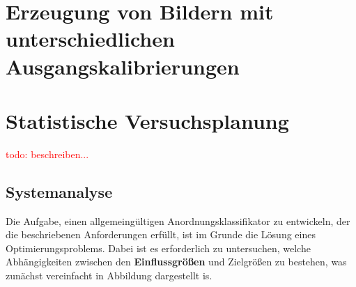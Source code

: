 \documentclass[
fontsize=10pt, 
listof = totoc,
parskip = half	
]{report}
\begin{document}
\section{Erzeugung von Bildern mit unterschiedlichen Ausgangskalibrierungen}


\section{Statistische Versuchsplanung}


\noindent\textcolor{red}{todo:  beschreiben...}  

\subsection{Systemanalyse}
Die Aufgabe, einen allgemeingültigen Anordnungsklassifikator zu entwickeln, der die beschriebenen Anforderungen erfüllt, ist im Grunde die Lösung eines Optimierungsproblems. Dabei ist es erforderlich zu untersuchen, welche Abhängigkeiten zwischen den \textbf{Einflussgrößen} und Zielgrößen zu bestehen, was zunächst vereinfacht in Abbildung dargestellt is.
       
\end{document}

